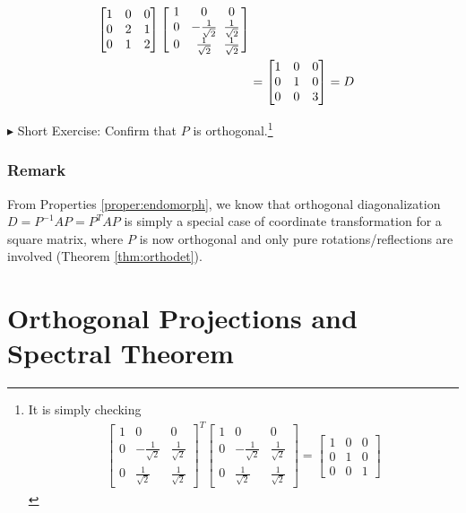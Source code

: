 \begin{solution}
\begin{align*}
\begin{bmatrix}
1 & 0 & 0 \\
0 & 2 & 1 \\
0 & 1 & 2
\end{bmatrix}
\left[\begin{array}{@{}wc{12pt}wc{12pt}wc{12pt}@{\,}}
1 & 0 & 0 \\
0 & -\frac{1}{\sqrt{2}} & \frac{1}{\sqrt{2}} \\
0 & \frac{1}{\sqrt{2}} & \frac{1}{\sqrt{2}}
\end{array}\right] \\
&= 
\begin{bmatrix}
1 & 0 & 0\\
0 & 1 & 0\\
0 & 0 & 3 
\end{bmatrix} = D
\end{align*}
\end{solution}
$\blacktriangleright$ Short Exercise: Confirm that $P$ is orthogonal.\footnote{It is simply checking
\begin{align*}
\begin{bmatrix}
1 & 0 & 0 \\
0 & -\frac{1}{\sqrt{2}} & \frac{1}{\sqrt{2}} \\
0 & \frac{1}{\sqrt{2}} & \frac{1}{\sqrt{2}}
\end{bmatrix}^T
\begin{bmatrix}
1 & 0 & 0 \\
0 & -\frac{1}{\sqrt{2}} & \frac{1}{\sqrt{2}} \\
0 & \frac{1}{\sqrt{2}} & \frac{1}{\sqrt{2}}
\end{bmatrix} = 
\begin{bmatrix}
1 & 0 & 0 \\
0 & 1 & 0 \\
0 & 0 & 1
\end{bmatrix}
\end{align*}
}

\subsubsection{Remark} From Properties \ref{proper:endomorph}, we know that orthogonal diagonalization $D = P^{-1}AP = P^TAP$ is simply a special case of coordinate transformation for a square matrix, where $P$ is now orthogonal and only pure rotations/reflections are involved (Theorem \ref{thm:orthodet}).

\section{Orthogonal Projections and Spectral Theorem}

